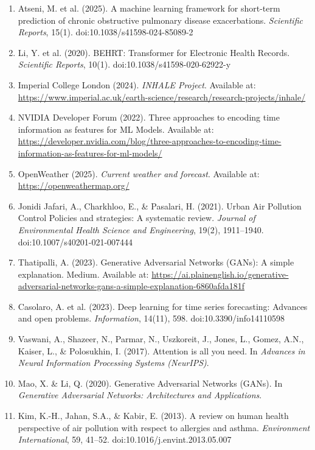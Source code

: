 \documentclass[12pt,a4paper]{report}
\begin{document}
\begin{enumerate}
\item Atseni, M. et al. (2025). A machine learning framework for short-term prediction of chronic obstructive pulmonary disease exacerbations. \emph{Scientific Reports}, 15(1). doi:10.1038/s41598-024-85089-2

\item Li, Y. et al. (2020). BEHRT: Transformer for Electronic Health Records. \emph{Scientific Reports}, 10(1). doi:10.1038/s41598-020-62922-y

\item Imperial College London (2024). \emph{INHALE Project}. Available at: \url{https://www.imperial.ac.uk/earth-science/research/research-projects/inhale/}

\item NVIDIA Developer Forum (2022). Three approaches to encoding time information as features for ML Models. Available at: \url{https://developer.nvidia.com/blog/three-approaches-to-encoding-time-information-as-features-for-ml-models/}

\item OpenWeather (2025). \emph{Current weather and forecast}. Available at: \url{https://openweathermap.org/}

\item Jonidi Jafari, A., Charkhloo, E., \& Pasalari, H. (2021). Urban Air Pollution Control Policies and strategies: A systematic review. \emph{Journal of Environmental Health Science and Engineering}, 19(2), 1911--1940. doi:10.1007/s40201-021-007444

\item Thatipalli, A. (2023). Generative Adversarial Networks (GANs): A simple explanation. Medium. Available at: \url{https://ai.plainenglish.io/generative-adversarial-networks-gans-a-simple-explanation-6860afda181f}

\item Casolaro, A. et al. (2023). Deep learning for time series forecasting: Advances and open problems. \emph{Information}, 14(11), 598. doi:10.3390/info14110598

\item Vaswani, A., Shazeer, N., Parmar, N., Uszkoreit, J., Jones, L., Gomez, A.N., Kaiser, L., \& Polosukhin, I. (2017). Attention is all you need. In \emph{Advances in Neural Information Processing Systems (NeurIPS)}.

\item Mao, X. \& Li, Q. (2020). Generative Adversarial Networks (GANs). In \emph{Generative Adversarial Networks: Architectures and Applications}. 

\item Kim, K.-H., Jahan, S.A., \& Kabir, E. (2013). A review on human health perspective of air pollution with respect to allergies and asthma. \emph{Environment International}, 59, 41--52. doi:10.1016/j.envint.2013.05.007


\end{enumerate}
\end{document}
